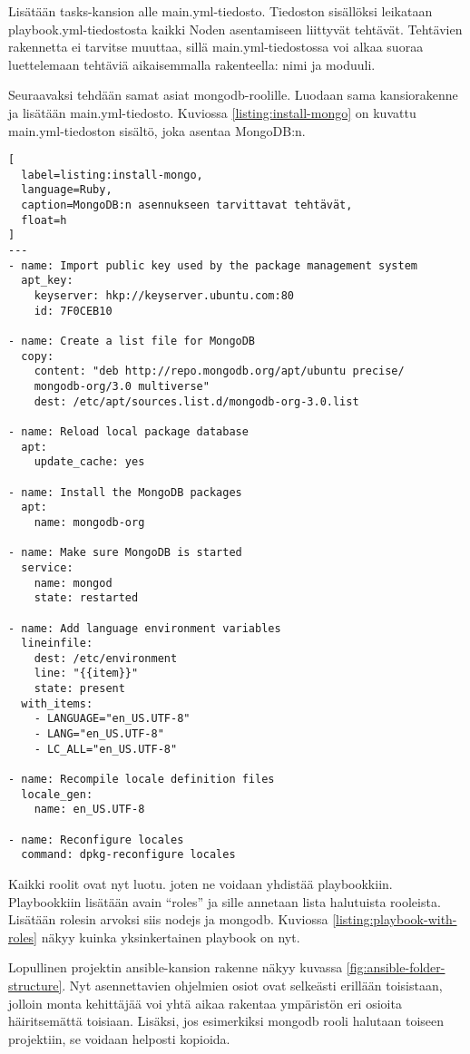 Lisätään tasks-kansion alle main.yml-tiedosto. Tiedoston sisällöksi leikataan playbook.yml-tiedostosta kaikki Noden asentamiseen liittyvät tehtävät. Tehtävien rakennetta ei tarvitse muuttaa, sillä main.yml-tiedostossa voi alkaa suoraa luettelemaan tehtäviä aikaisemmalla rakenteella: nimi ja moduuli.

Seuraavaksi tehdään samat asiat mongodb-roolille. Luodaan sama kansiorakenne ja lisätään main.yml-tiedosto. Kuviossa \ref{listing:install-mongo} on kuvattu main.yml-tiedoston sisältö, joka asentaa MongoDB:n.

\begin{lstlisting}[
  label=listing:install-mongo,
  language=Ruby,
  caption=MongoDB:n asennukseen tarvittavat tehtävät,
  float=h
]
---
- name: Import public key used by the package management system
  apt_key:
    keyserver: hkp://keyserver.ubuntu.com:80
    id: 7F0CEB10

- name: Create a list file for MongoDB
  copy:
    content: "deb http://repo.mongodb.org/apt/ubuntu precise/
    mongodb-org/3.0 multiverse"
    dest: /etc/apt/sources.list.d/mongodb-org-3.0.list

- name: Reload local package database
  apt:
    update_cache: yes

- name: Install the MongoDB packages
  apt:
    name: mongodb-org

- name: Make sure MongoDB is started
  service:
    name: mongod
    state: restarted

- name: Add language environment variables
  lineinfile:
    dest: /etc/environment
    line: "{{item}}"
    state: present
  with_items:
    - LANGUAGE="en_US.UTF-8"
    - LANG="en_US.UTF-8"
    - LC_ALL="en_US.UTF-8"

- name: Recompile locale definition files
  locale_gen:
    name: en_US.UTF-8

- name: Reconfigure locales
  command: dpkg-reconfigure locales
\end{lstlisting}

Kaikki roolit ovat nyt luotu. joten ne voidaan yhdistää playbookkiin. Playbookkiin lisätään avain \enquote{roles} ja sille annetaan lista halutuista rooleista. Lisätään rolesin arvoksi siis nodejs ja mongodb. Kuviossa \ref{listing:playbook-with-roles} näkyy kuinka yksinkertainen playbook on nyt.

Lopullinen projektin ansible-kansion rakenne näkyy kuvassa \ref{fig:ansible-folder-structure}. Nyt asennettavien ohjelmien osiot ovat selkeästi erillään toisistaan, jolloin monta kehittäjää voi yhtä aikaa rakentaa ympäristön eri osioita häiritsemättä toisiaan. Lisäksi, jos esimerkiksi mongodb rooli halutaan toiseen projektiin, se voidaan helposti kopioida.

